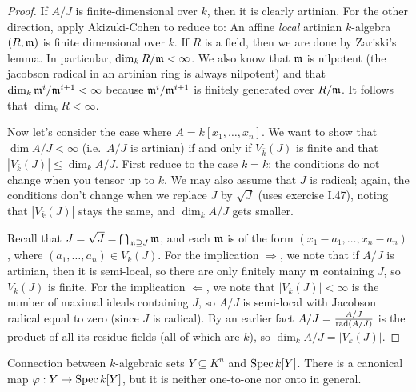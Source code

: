  \begin{proof}
   If $A/J$ is finite-dimensional over $k$, then it is clearly artinian. For the other
   direction, apply Akizuki-Cohen \anton{} to reduce to: An affine \emph{local} artinian
   $k$-algebra $(R,\mathfrak{m})$ is finite dimensional over $k$. If $R$ is a field, then we are
   done by Zariski's lemma. In particular, $\dim_k R/\mathfrak{m} < \infty$. We also know that $\mathfrak{m}$
   is nilpotent (the jacobson radical in an artinian ring is always nilpotent) and that
   $\dim_k \mathfrak{m}^i/\mathfrak{m}^{i+1} <\infty$ because $\mathfrak{m}^i/\mathfrak{m}^{i+1}$ is finitely generated over
   $R/\mathfrak{m}$. It follows that $\dim_k R<\infty$.

   Now let's consider the case where $A=k[x_1,\dots, x_n]$. We want to show that $\dim
   A/J< \infty$ (i.e.~$A/J$ is artinian) if and only if $V_{\bar k}(J)$ is finite and
   that $|V_{\bar k}(J)|\le \dim_k A/J$. First reduce to the case $k=\bar k$; the
   conditions do not change when you tensor up to $\bar k$. We may also assume that $J$
   is radical; again, the conditions don't change when we replace $J$ by $\sqrt J$ (uses
   exercise I.47), noting that $|V_{\bar k}(J)|$ stays the same, and $\dim_k A/J$ gets
   smaller.

   Recall that $J=\sqrt J=\bigcap_{\mathfrak{m}\supseteq J} \mathfrak{m}$, and each $\mathfrak{m}$ is of the form
   $(x_1-a_1,\dots, x_n-a_n)$, where $(a_1,\dots, a_n)\in V_k(J)$. For the implication
   $\Rightarrow$, we note that if $A/J$ is artinian, then it is semi-local, so there are
   only finitely many $\mathfrak{m}$ containing $J$, so $V_k(J)$ is finite. For the implication
   $\Leftarrow$, we note that $|V_k(J)|<\infty$ is the number of maximal ideals
   containing $J$, so $A/J$ is semi-local with Jacobson radical equal to zero (since $J$
   is radical). By an earlier fact \anton{} $A/J=\frac{A/J}{\operatorname{rad} (A/J)}$ is the product of
   all its residue fields (all of which are $k$), so $\dim_k A/J = |V_{k}(J)|$.
 \end{proof}

 Connection between $k$-algebraic sets $Y\subseteq K^n$ and $\operatorname{Spec} k[Y]$. There is a
 canonical map $\varphi:Y\mapsto \operatorname{Spec} k[Y]$, but it is neither one-to-one nor onto in
 general.
